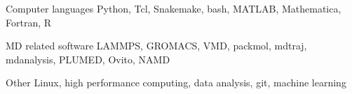 
\begin{cvskills}
  
  \cvskill
    {Computer languages} %
    {Python, Tcl, Snakemake, bash, MATLAB, Mathematica, Fortran, R} %

  \cvskill
    {MD related software} %
    {LAMMPS, GROMACS, VMD, packmol, mdtraj, mdanalysis, PLUMED, Ovito, NAMD} %
  
  \cvskill
    {Other} %
    {Linux, high performance computing, data analysis, git, machine learning} %
    
\end{cvskills}
